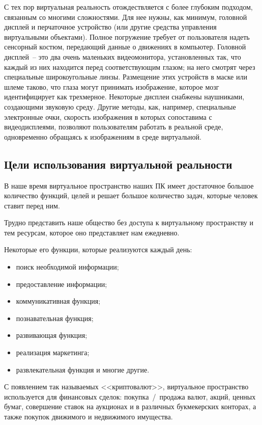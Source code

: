   С тех пор виртуальная реальность отождествляется с более глубоким подходом,
  связанным со многими сложностями. Для нее нужны, как минимум, головной
  дисплей и перчаточное устройство (или другие средства управления виртуальными
  объектами). Полное погружение требует от пользователя надеть сенсорный
  костюм, передающий данные о движениях в компьютер. Головной дисплей~-- это
  два очень маленьких видеомонитора, установленных так, что каждый из них
  находится перед соответствующим глазом; на него смотрят через специальные
  широкоугольные линзы. Размещение этих устройств в маске или шлеме таково, что
  глаза могут принимать изображение, которое мозг идентифицирует как
  трехмерное. Некоторые дисплеи снабжены наушниками, создающими звуковую среду.
  Другие методы, как, например, специальные электронные очки, скорость
  изображения в которых сопоставима с видеодисплеями, позволяют пользователям
  работать в реальной среде, одновременно обращаясь к изображениям в среде
  виртуальной.
    
  \subsection{Цели использования виртуальной реальности}
  В наше время виртуальное пространство наших ПК имеет достаточное большое
  количество функций, целей и решает большое количество задач, которые человек
  ставит перед ним.
  
  Трудно представить наше общество без доступа к виртуальному пространству и
  тем ресурсам, которое оно представляет нам ежедневно.
  
  Некоторые его функции, которые реализуются каждый день:
  \begin{itemize}
    \item поиск необходимой информации;
    \item предоставление информации;
    \item коммуникативная функция;
    \item познавательная функция;
    \item развивающая функция;
    \item реализация маркетинга;
    \item развлекательная функция и многие другие.
  \end{itemize}
  
  С появлением так называемых <<криптовалют>>, виртуальное пространство
  используется для финансовых сделок: покупка~/~продажа валют, акций, ценных
  бумаг, совершение ставок на аукционах и в различных букмекерских конторах, а
  также покупок движимого и недвижимого имущества.
  
